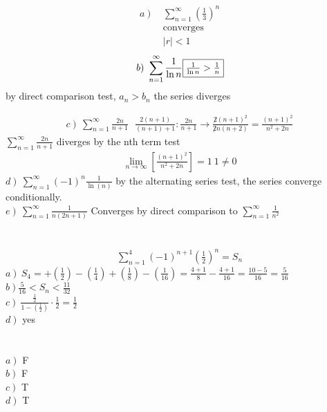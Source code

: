 \documentclass{article}
\begin{document}
\section{}
	\begin{multicols}{2}
		\begin{align*}
			\left.a\right)\ &\sum\limits_{n=1}^{\infty}{\left(\frac{1}{3}\right)^n}\\
			&\text{converges}\\
			&\left|r\right|<1
		\end{align*}
		\vfill\columnbreak
		\begin{align*}
			\left.b\right)\ 
			\sum\limits_{n=1}^{\infty}{\frac{1}{\ln{n}}}
			\fbox{$\frac{1}{\ln{n}}>\frac{1}{n}$}
		\end{align*}
		by direct comparison test, $a_n>b_n$ the series diverges
	\end{multicols}
	\begin{align*}
		\left.c\right)\ \sum\limits_{n=1}^{\infty}{\frac{2n}{n+1}}\ \ \ \frac{2(n+1)}{(n+1)+1}: \frac{2n}{n+1}\rightarrow \frac{\not 2 (n+1)^2}{\not 2 n(n+2)}=\frac{(n+1)^2}{n^2+2n}
	\end{align*}
	$\sum\limits_{n=1}^{\infty}{\frac{2n}{n+1}}$ diverges by the nth term test
	\begin{align*}
		\lim\limits_{n\rightarrow \infty}\left[\frac{(n+1)^2}{n^2+2n}\right]=1\ 1\not=0
	\end{align*}
	$\left.d\right)\ \sum\limits_{n=1}^{\infty}{\left(-1\right)}^n\frac{1}{\ln(n)}$ by the alternating series test, the series converge conditionally.\\
	$\left.e\right)\ \sum\limits_{n=1}^{\infty}\frac{1}{n(2n+1)}$ Converges by direct comparison to $\sum\limits_{n=1}^{\infty}{\frac{1}{n^2}}$
	
\section{}	
	\begin{align*}
		\sum\limits_{n=1}^{4}{\left(-1\right)^{n+1}\left(\frac{1}{2}\right)^n}=S_n
	\end{align*}
	$\left.a\right)\ S_4 = +\left(\frac{1}{2}\right)-\left(\frac{1}{4}\right)+\left(\frac{1}{8}\right)-\left(\frac{1}{16}\right) = \frac{4+1}{8}-\frac{4+1}{16} = \frac{10-5}{16} = \frac{5}{16}$\\
	$\left.b\right) \frac{5}{16}<S_n<\frac{11}{32}$\\
	$\left.c\right)\ \frac{\frac{1}{2}}{1-\left(\frac{1}{2}\right)}\cdot \frac{1}{2}=\frac{1}{2}$\\
	$\left.d\right)$ yes
	
\section{}
	\begin{multicols}{4}
		$\left.a\right)$ F\\
		\vfill\columnbreak
		$\left.b\right)$ F\\
		\vfill\columnbreak
		$\left.c\right)$ T\\
		\vfill\columnbreak
		$\left.d\right)$ T
	\end{multicols}
	
\end{document}

